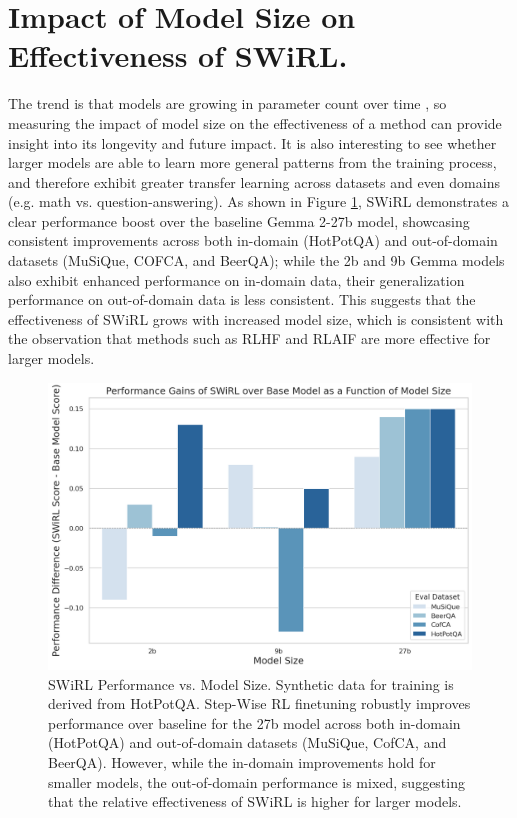 \documentclass{article} %
\begin{document}
\clearpage

\section{Impact of Model Size on Effectiveness of SWiRL.}\label{sec:appendix-model-size} The trend is that models are growing in parameter count over time \citep{sevilla2022trends}, so measuring the impact of model size on the effectiveness of a method can provide insight into its longevity and future impact. It is also interesting to see whether larger models are able to learn more general patterns from the training process, and therefore exhibit greater transfer learning across datasets and even domains (e.g. math vs. question-answering). As shown in Figure \ref{fig:model-size}, SWiRL demonstrates a clear performance boost over the baseline Gemma 2-27b model, showcasing consistent improvements across both in-domain (HotPotQA) and out-of-domain datasets (MuSiQue, COFCA, and BeerQA); while the 2b and 9b Gemma models also exhibit enhanced performance on in-domain data, their generalization performance on out-of-domain data is less consistent. This suggests that the effectiveness of SWiRL grows with increased model size, which is consistent with the observation that methods such as RLHF \citep{ouyang2022traininglanguagemodelsfollow} and RLAIF \citep{bai2022constitutionalaiharmlessnessai} are more effective for larger models. 
\begin{figure}[htbp!]
    \centering
    \includegraphics[width=.6\textwidth]{modelsize-new.png}
    \caption{SWiRL Performance vs. Model Size. Synthetic data for training is derived from HotPotQA. Step-Wise RL finetuning robustly improves performance over baseline for the 27b model across both in-domain (HotPotQA) and out-of-domain datasets (MuSiQue, CofCA, and BeerQA). However, while the in-domain improvements hold for smaller models, the out-of-domain performance is mixed, suggesting that the relative effectiveness of SWiRL is higher for larger models. }
    \label{fig:model-size}
\end{figure}
\end{document}
